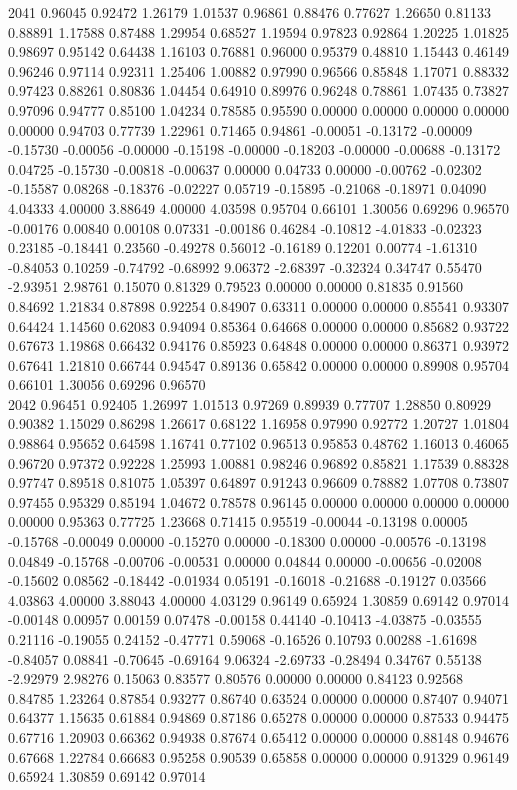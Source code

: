 {2041 0.96045 0.92472 1.26179 1.01537 0.96861 0.88476 0.77627 1.26650 0.81133 0.88891 1.17588 0.87488 1.29954 0.68527 1.19594 0.97823 0.92864 1.20225 1.01825 0.98697 0.95142 0.64438 1.16103 0.76881 0.96000 0.95379 0.48810 1.15443 0.46149 0.96246 0.97114 0.92311 1.25406 1.00882 0.97990 0.96566 0.85848 1.17071 0.88332 0.97423 0.88261 0.80836 1.04454 0.64910 0.89976 0.96248 0.78861 1.07435 0.73827 0.97096 0.94777 0.85100 1.04234 0.78585 0.95590 0.00000 0.00000 0.00000 0.00000 0.00000 0.94703 0.77739 1.22961 0.71465 0.94861 -0.00051 -0.13172 -0.00009 -0.15730 -0.00056 -0.00000 -0.15198 -0.00000 -0.18203 -0.00000 -0.00688 -0.13172 0.04725 -0.15730 -0.00818 -0.00637 0.00000 0.04733 0.00000 -0.00762 -0.02302 -0.15587 0.08268 -0.18376 -0.02227 0.05719 -0.15895 -0.21068 -0.18971 0.04090 4.04333 4.00000 3.88649 4.00000 4.03598 0.95704 0.66101 1.30056 0.69296 0.96570 -0.00176 0.00840 0.00108 0.07331 -0.00186 0.46284 -0.10812 -4.01833 -0.02323 0.23185 -0.18441 0.23560 -0.49278 0.56012 -0.16189 0.12201 0.00774 -1.61310 -0.84053 0.10259 -0.74792 -0.68992 9.06372 -2.68397 -0.32324 0.34747 0.55470 -2.93951 2.98761 0.15070 0.81329 0.79523 0.00000 0.00000 0.81835 0.91560 0.84692 1.21834 0.87898 0.92254 0.84907 0.63311 0.00000 0.00000 0.85541 0.93307 0.64424 1.14560 0.62083 0.94094 0.85364 0.64668 0.00000 0.00000 0.85682 0.93722 0.67673 1.19868 0.66432 0.94176 0.85923 0.64848 0.00000 0.00000 0.86371 0.93972 0.67641 1.21810 0.66744 0.94547 0.89136 0.65842 0.00000 0.00000 0.89908 0.95704 0.66101 1.30056 0.69296 0.96570 \\
2042 0.96451 0.92405 1.26997 1.01513 0.97269 0.89939 0.77707 1.28850 0.80929 0.90382 1.15029 0.86298 1.26617 0.68122 1.16958 0.97990 0.92772 1.20727 1.01804 0.98864 0.95652 0.64598 1.16741 0.77102 0.96513 0.95853 0.48762 1.16013 0.46065 0.96720 0.97372 0.92228 1.25993 1.00881 0.98246 0.96892 0.85821 1.17539 0.88328 0.97747 0.89518 0.81075 1.05397 0.64897 0.91243 0.96609 0.78882 1.07708 0.73807 0.97455 0.95329 0.85194 1.04672 0.78578 0.96145 0.00000 0.00000 0.00000 0.00000 0.00000 0.95363 0.77725 1.23668 0.71415 0.95519 -0.00044 -0.13198 0.00005 -0.15768 -0.00049 0.00000 -0.15270 0.00000 -0.18300 0.00000 -0.00576 -0.13198 0.04849 -0.15768 -0.00706 -0.00531 0.00000 0.04844 0.00000 -0.00656 -0.02008 -0.15602 0.08562 -0.18442 -0.01934 0.05191 -0.16018 -0.21688 -0.19127 0.03566 4.03863 4.00000 3.88043 4.00000 4.03129 0.96149 0.65924 1.30859 0.69142 0.97014 -0.00148 0.00957 0.00159 0.07478 -0.00158 0.44140 -0.10413 -4.03875 -0.03555 0.21116 -0.19055 0.24152 -0.47771 0.59068 -0.16526 0.10793 0.00288 -1.61698 -0.84057 0.08841 -0.70645 -0.69164 9.06324 -2.69733 -0.28494 0.34767 0.55138 -2.92979 2.98276 0.15063 0.83577 0.80576 0.00000 0.00000 0.84123 0.92568 0.84785 1.23264 0.87854 0.93277 0.86740 0.63524 0.00000 0.00000 0.87407 0.94071 0.64377 1.15635 0.61884 0.94869 0.87186 0.65278 0.00000 0.00000 0.87533 0.94475 0.67716 1.20903 0.66362 0.94938 0.87674 0.65412 0.00000 0.00000 0.88148 0.94676 0.67668 1.22784 0.66683 0.95258 0.90539 0.65858 0.00000 0.00000 0.91329 0.96149 0.65924 1.30859 0.69142 0.97014 \\
}

